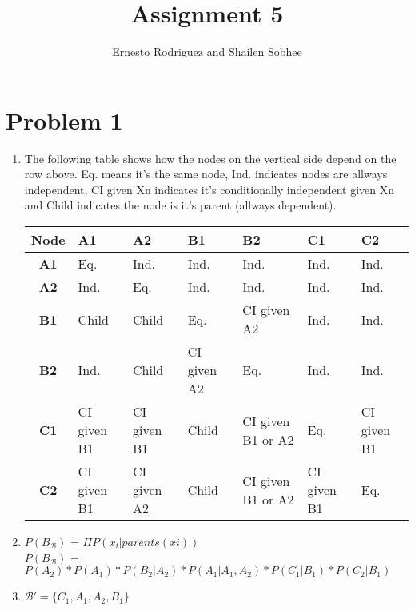 \documentclass{article}
\title{Assignment 5}
\author{Ernesto Rodriguez and Shailen Sobhee}
\begin{document}
\maketitle

\section{Problem 1}

\begin{enumerate}

\item{

  The following table shows how the nodes on the vertical side depend on the row above. Eq. means it's the same node, Ind. indicates nodes are allways independent, CI given Xn indicates it's conditionally independent given Xn and Child indicates the node is it's parent (allways dependent).

  \begin{tabular}{ | c | p{12mm} | p{12mm} | p{12mm} | p{12mm} | p{12mm} | p{12mm} |}

    \hline
    {\bf Node} & {\bf A1} & {\bf A2} &{\bf B1} &{\bf B2} &{\bf C1} &{\bf C2} \\
    \hline
    {\bf A1} & Eq. & Ind. & Ind. & Ind. & Ind. & Ind. \\
    \hline
    {\bf A2} & Ind. & Eq. & Ind. & Ind. & Ind. & Ind. \\
    \hline
    {\bf B1} & Child & Child & Eq. & CI given A2 & Ind. & Ind. \\
    \hline
    {\bf B2} & Ind. & Child & CI given A2 & Eq. & Ind. & Ind. \\
    \hline
    {\bf C1} & CI given B1 & CI given B1 & Child & CI given B1 or A2 & Eq. & CI given B1 \\
    \hline
    {\bf C2} & CI given B1 & CI given A2 & Child & CI given B1 or A2 & CI given B1 & Eq. \\
    \hline
  \end{tabular}

}

\item{

  $P(B_{\mathcal{B}})$ = $\Pi P(x_i|parents(xi))$\\
  $P(B_{\mathcal{B}})$ = $P(A_2)*P(A_1)*P(B_2|A_2)*P(A_1|A_1,A_2)*P(C_1|B_1)*P(C_2|B_1)$\\
}

\item{

  $\mathcal{B}'=\{C_1,A_1,A_2,B_1\}$
}


\end{enumerate}
\end{document}
